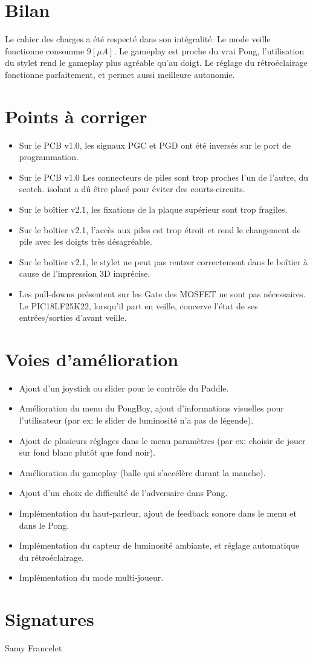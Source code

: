 \section{Bilan}
Le cahier des charges a été respecté dans son intégralité. Le mode veille
fonctionne consomme $9[\mu A]$.
Le gameplay est proche du vrai Pong, l'utilisation du stylet rend le gameplay
plus agréable qu'au doigt.
Le réglage du rétroéclairage fonctionne parfaitement, et permet aussi meilleure
autonomie.

\section{Points à corriger}
\begin{itemize}
  \item Sur le PCB v1.0, les signaux PGC et PGD ont été inversés sur le port
  de programmation.
  \item Sur le PCB v1.0 Les connecteurs de piles sont trop proches l'un de l'autre, du scotch.
  isolant a dû être placé pour éviter des courts-circuits.
  \item Sur le boîtier v2.1, les fixations de la plaque supérieur sont trop
  fragiles.
  \item Sur le boîtier v2.1, l'accès aux piles est trop étroit et rend
  le changement de pile avec les doigts très désagréable.
  \item Sur le boîtier v2.1, le stylet ne peut pas rentrer correctement dans
  le boîtier à cause de l'impression 3D imprécise.
  \item Les pull-downs présentent sur les Gate des MOSFET ne sont pas
  nécessaires. Le PIC18LF25K22, lorsqu'il part en veille, concerve
  l'état de ses entrées/sorties d'avant veille.
\end{itemize}

\section{Voies d'amélioration}
\begin{itemize}
  \item Ajout d'un joystick ou slider pour le contrôle du Paddle.
  \item Amélioration du menu du PongBoy, ajout d'informations visuelles pour
  l'utilisateur (par ex: le slider de luminosité n'a pas de légende).
  \item Ajout de plusieurs réglages dans le menu paramètres (par ex: choisir
  de jouer sur fond blanc plutôt que fond noir).
  \item Amélioration du gameplay (balle qui s'accélère durant la manche).
  \item Ajout d'un choix de difficulté de l'adversaire dans Pong.
  \item Implémentation du haut-parleur, ajout de feedback sonore dans le menu
  et dans le Pong.
  \item Implémentation du capteur de luminosité ambiante, et réglage automatique
  du rétroéclairage.
  \item Implémentation du mode multi-joueur.
\end{itemize}

\section{Signatures}
Samy Francelet

